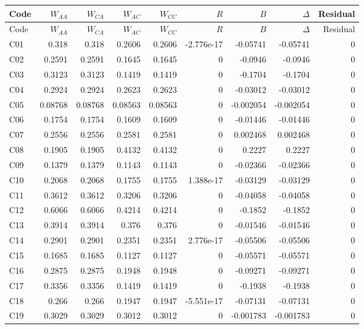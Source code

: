 \documentclass[10pt]{article}
\begin{document}
\small\setlength{\tabcolsep}{6pt}\begin{longtable}{@{}lrrrrrrrr@{}}
\toprule Code & $W_{AA}$ & $W_{CA}$ & $W_{AC}$ & $W_{CC}$ & $R$ & $B$ & $\Delta$ & Residual\\\midrule\endfirsthead
\toprule Code & $W_{AA}$ & $W_{CA}$ & $W_{AC}$ & $W_{CC}$ & $R$ & $B$ & $\Delta$ & Residual\\\midrule\endhead\bottomrule\endfoot
C01 & 0.318 & 0.318 & 0.2606 & 0.2606 & -2.776e-17 & -0.05741 & -0.05741 & 0\\[1pt]
C02 & 0.2591 & 0.2591 & 0.1645 & 0.1645 & 0 & -0.0946 & -0.0946 & 0\\[1pt]
C03 & 0.3123 & 0.3123 & 0.1419 & 0.1419 & 0 & -0.1704 & -0.1704 & 0\\[1pt]
C04 & 0.2924 & 0.2924 & 0.2623 & 0.2623 & 0 & -0.03012 & -0.03012 & 0\\[1pt]
C05 & 0.08768 & 0.08768 & 0.08563 & 0.08563 & 0 & -0.002054 & -0.002054 & 0\\[1pt]
C06 & 0.1754 & 0.1754 & 0.1609 & 0.1609 & 0 & -0.01446 & -0.01446 & 0\\[1pt]
C07 & 0.2556 & 0.2556 & 0.2581 & 0.2581 & 0 & 0.002468 & 0.002468 & 0\\[1pt]
C08 & 0.1905 & 0.1905 & 0.4132 & 0.4132 & 0 & 0.2227 & 0.2227 & 0\\[1pt]
C09 & 0.1379 & 0.1379 & 0.1143 & 0.1143 & 0 & -0.02366 & -0.02366 & 0\\[1pt]
C10 & 0.2068 & 0.2068 & 0.1755 & 0.1755 & 1.388e-17 & -0.03129 & -0.03129 & 0\\[1pt]
C11 & 0.3612 & 0.3612 & 0.3206 & 0.3206 & 0 & -0.04058 & -0.04058 & 0\\[1pt]
C12 & 0.6066 & 0.6066 & 0.4214 & 0.4214 & 0 & -0.1852 & -0.1852 & 0\\[1pt]
C13 & 0.3914 & 0.3914 & 0.376 & 0.376 & 0 & -0.01546 & -0.01546 & 0\\[1pt]
C14 & 0.2901 & 0.2901 & 0.2351 & 0.2351 & 2.776e-17 & -0.05506 & -0.05506 & 0\\[1pt]
C15 & 0.1685 & 0.1685 & 0.1127 & 0.1127 & 0 & -0.05571 & -0.05571 & 0\\[1pt]
C16 & 0.2875 & 0.2875 & 0.1948 & 0.1948 & 0 & -0.09271 & -0.09271 & 0\\[1pt]
C17 & 0.3356 & 0.3356 & 0.1419 & 0.1419 & 0 & -0.1938 & -0.1938 & 0\\[1pt]
C18 & 0.266 & 0.266 & 0.1947 & 0.1947 & -5.551e-17 & -0.07131 & -0.07131 & 0\\[1pt]
C19 & 0.3029 & 0.3029 & 0.3012 & 0.3012 & 0 & -0.001783 & -0.001783 & 0\\[1pt]

\end{longtable}
\end{document}
